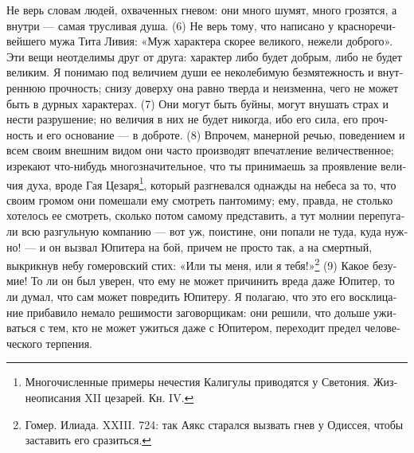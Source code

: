 Не верь сло­вам людей, охва­чен­ных гне­вом: они мно­го шумят, мно­го гро­зят­ся, а внут­ри --- самая трус­ли­вая душа. (6) Не верь тому, что напи­са­но у крас­но­ре­чи­вей­ше­го мужа Тита Ливия: «Муж харак­те­ра ско­рее вели­ко­го, неже­ли доброго». Эти вещи неот­де­ли­мы друг от дру­га: харак­тер либо будет доб­рым, либо не будет вели­ким. Я пони­маю под вели­чи­ем души ее неко­ле­би­мую без­мя­теж­ность и внут­рен­нюю проч­ность; сни­зу довер­ху она рав­но твер­да и неиз­мен­на, чего не может быть в дур­ных харак­те­рах. (7) Они могут быть буй­ны, могут вну­шать страх и нести раз­ру­ше­ние; но вели­чия в них не будет нико­гда, ибо его сила, его проч­ность и его осно­ва­ние --- в доб­ро­те. (8) Впро­чем, манер­ной речью, поведе­ни­ем и всем сво­им внеш­ним видом они часто про­из­во­дят впе­чат­ле­ние вели­че­ст­вен­ное; изре­ка­ют что-нибудь мно­го­зна­чи­тель­ное, что ты при­ни­ма­ешь за про­яв­ле­ние вели­чия духа, вро­де Гая Цезаря\footnote{Мно­го­чис­лен­ные при­ме­ры нече­стия Кали­гу­лы при­во­дят­ся у Све­то­ния. Жиз­не­опи­са­ния XII цеза­рей. Кн. IV.}, кото­рый раз­гне­вал­ся одна­жды на небе­са за то, что сво­им гро­мом они поме­ша­ли ему смот­реть пан­то­ми­му; ему, прав­да, не столь­ко хоте­лось ее смот­реть, сколь­ко потом само­му пред­ста­вить, а тут мол­нии пере­пу­га­ли всю раз­гуль­ную ком­па­нию --- вот уж, поис­ти­не, они попа­ли не туда, куда нуж­но! --- и он вызвал Юпи­те­ра на бой, при­чем не про­сто так, а на смерт­ный, выкрик­нув небу гоме­ров­ский стих: «Или ты меня, или я тебя!»\footnote{Гомер. Или­а­да. XXIII. 724: так Аякс ста­рал­ся вызвать гнев у Одис­сея, чтобы заста­вить его сра­зить­ся.} (9) Какое безу­мие! То ли он был уве­рен, что ему не может при­чи­нить вреда даже Юпи­тер, то ли думал, что сам может повредить Юпи­те­ру. Я пола­гаю, что это его вос­кли­ца­ние при­ба­ви­ло нема­ло реши­мо­сти заго­вор­щи­кам: они реши­ли, что доль­ше ужи­вать­ся с тем, кто не может ужить­ся даже с Юпи­те­ром, пере­хо­дит пре­дел чело­ве­че­ско­го тер­пе­ния.

